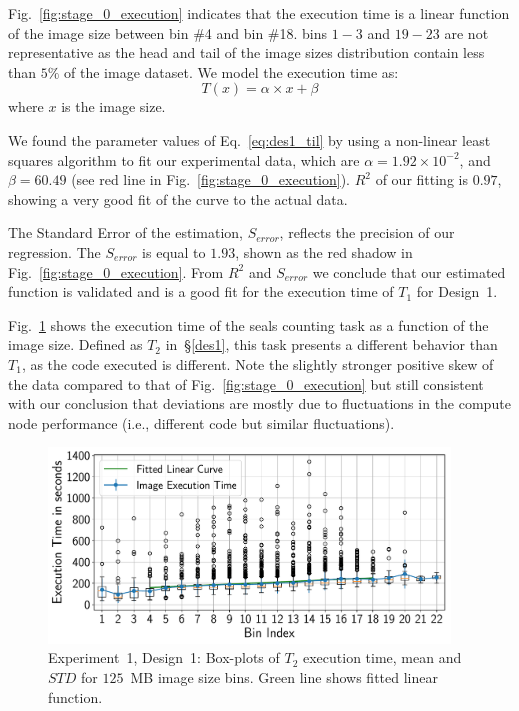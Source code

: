 Fig.~\ref{fig:stage_0_execution} indicates that the execution time is a
linear function of the image size between bin \#4 and bin \#18. bins $1-3$
and $19-23$ are not representative as the head and tail of the image sizes
distribution contain less than $5\%$ of the image dataset. We model the
execution time as:
\begin{equation}
	T(x) = \alpha \times x+\beta
	\label{eq:des1_til}
\end{equation} where $x$ is the image size.

We found the parameter values of Eq.~\ref{eq:des1_til} by using a non-linear
least squares algorithm to fit our experimental data, which are $\alpha=
1.92 \times 10^{-2}$, and $\beta = 60.49$ (see red line in
Fig.~\ref{fig:stage_0_execution}). $R^{2}$ of our fitting is $0.97$, showing
a very good fit of the curve to the actual data.

The Standard Error of the estimation, $S_{error}$, reflects the precision of
our regression. The $S_{error}$ is equal to $1.93$, shown as the red shadow
in Fig.~\ref{fig:stage_0_execution}. From $R^{2}$ and $S_{error}$ we conclude
that our estimated function is validated and is a good fit for the execution
time of $T_{1}$ for Design~1.


Fig.~\ref{fig:stage_1_execution} shows the execution time of the seals
counting task as a function of the image size. Defined as $T_{2}$
in~\S\ref{des1}, this task presents a different behavior than $T_{1}$, as the
code executed is different. Note the slightly stronger positive skew of the
data compared to that of Fig.~\ref{fig:stage_0_execution} but still
consistent with our conclusion that deviations are mostly due to fluctuations
in the compute node performance (i.e., different code but similar
fluctuations).

\begin{figure}[ht!]
	\centering
	\includegraphics[width=0.95\textwidth]{figures/designs/stage_1_tx_box.pdf}
	\caption{Experiment~1, Design~1: Box-plots of $T_{2}$ execution time,
		mean and $STD$ for $125$~MB image size bins. Green line shows fitted
		linear function.}
	\label{fig:stage_1_execution}
\end{figure}

